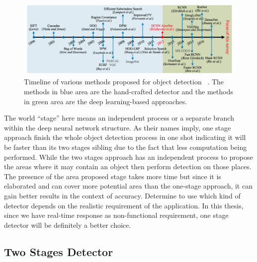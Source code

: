 \begin{figure}
    \includegraphics[width=\linewidth]{figures/timeline_od.png}
    \caption[Timeline of various methods proposed for object detection]
    {Timeline of various methods proposed for object detection
    ~\protect\cite{survey1-on-dl-od-2018}. The methods in blue area are the
    hand-crafted detector and the methods in green area are the deep
    learning-based approaches.}
    \label{fig:od-timeline}
\end{figure}

The world ``stage'' here means an independent process or a separate branch
within the deep neural network structure.
As their names imply, one stage approach finish the whole object detection
process in one shot indicating it will be faster than its two stages sibling
due to the fact that less computation being performed.
While the two stages approach has an independent process to propose the areas
where it may contain an object then perform detection on those places. The
presence of the area proposed stage takes more time but since it is elaborated
and can cover more potential area than the one-stage approach, it can gain
better results in the context of accuracy.
Determine to use which kind of detector depends on the realistic
requirement of the application. In this thesis, since we have real-time response
as non-functional requirement, one stage detector will be definitely a better 
choice. 

\subsection{Two Stages Detector}
\label{sec:related-worked-two-stages-detector}

